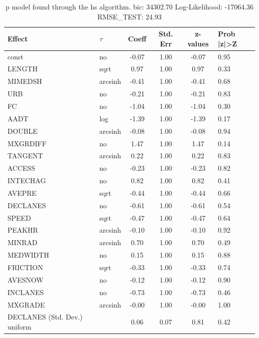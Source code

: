\begin{table}
	\caption{p model found through the hs algorithm. bic: 34302.70 Log-Likelihood: -17064.36 RMSE_TEST: 24.93}
	\begin{center}
		\begin{tabular}{|l|l|c|c|c|l|}
			\hline
			Effect & $\tau$ & Coeff & Std. Err & z-values & Prob |z|>Z \\
			\hline
			const & no & -0.07 & 1.00 & -0.07 & 0.95 \\
			\hline
			LENGTH & sqrt & 0.97 & 1.00 & 0.97 & 0.33 \\
			\hline
			MIMEDSH & arcsinh & -0.41 & 1.00 & -0.41 & 0.68 \\
			\hline
			URB & no & -0.21 & 1.00 & -0.21 & 0.83 \\
			\hline
			FC & no & -1.04 & 1.00 & -1.04 & 0.30 \\
			\hline
			AADT & log & -1.39 & 1.00 & -1.39 & 0.17 \\
			\hline
			DOUBLE & arcsinh & -0.08 & 1.00 & -0.08 & 0.94 \\
			\hline
			MXGRDIFF & no & 1.47 & 1.00 & 1.47 & 0.14 \\
			\hline
			TANGENT & arcsinh & 0.22 & 1.00 & 0.22 & 0.83 \\
			\hline
			ACCESS & no & -0.23 & 1.00 & -0.23 & 0.82 \\
			\hline
			INTECHAG & no & 0.82 & 1.00 & 0.82 & 0.41 \\
			\hline
			AVEPRE & sqrt & -0.44 & 1.00 & -0.44 & 0.66 \\
			\hline
			DECLANES & no & -0.61 & 1.00 & -0.61 & 0.54 \\
			\hline
			SPEED & sqrt & -0.47 & 1.00 & -0.47 & 0.64 \\
			\hline
			PEAKHR & arcsinh & -0.10 & 1.00 & -0.10 & 0.92 \\
			\hline
			MINRAD & arcsinh & 0.70 & 1.00 & 0.70 & 0.49 \\
			\hline
			MEDWIDTH & no & 0.15 & 1.00 & 0.15 & 0.88 \\
			\hline
			FRICTION & sqrt & -0.33 & 1.00 & -0.33 & 0.74 \\
			\hline
			AVESNOW & no & -0.12 & 1.00 & -0.12 & 0.90 \\
			\hline
			INCLANES & no & -0.73 & 1.00 & -0.73 & 0.46 \\
			\hline
			MXGRADE & arcsinh & -0.00 & 1.00 & -0.00 & 1.00 \\
			\hline
			DECLANES (Std. Dev.) uniform &  & 0.06 & 0.07 & 0.81 & 0.42 \\

\end{tabular}
\end{center}
\end{table}
